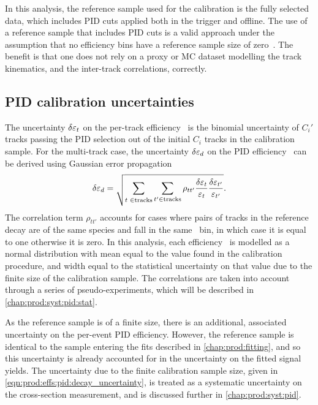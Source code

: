 In this analysis, the reference sample used for the calibration is the fully 
selected data, which includes \ac{PID} cuts applied both in the trigger and 
offline.
The use of a reference sample that includes \ac{PID} cuts is a valid approach 
under the assumption that no efficiency bins have a reference sample size of 
zero~\cite{Anderlini:2202412}.
The benefit is that one does not rely on a proxy or \ac{MC} dataset modelling 
the track kinematics, and the inter-track correlations, correctly.

\subsection{\ac{PID} calibration uncertainties}
\label{chap:prod:effs:pid:uncertainties}

The uncertainty $\delta{\ensuremath{\varepsilon_{t}}}$ on the per-track efficiency \effpidtrack\ 
is the binomial uncertainty of $C_{i}'$ tracks passing the \ac{PID} selection 
out of the initial $C_{i}$ tracks in the calibration sample.
For the multi-track case, the uncertainty $\delta{\ensuremath{\varepsilon_{d}}}$ on the \ac{PID} 
efficiency \effpiddecay\ can be derived using Gaussian error propagation
\begin{equation}
  \unc{\effpiddecay} = \sqrt{%
    \sum_{t\phantom{'}\in\text{tracks}}\sum_{t'\in\text{tracks}}
      \rho_{tt'}
      \frac{%
        \unc{\effpidtrack}
      }{%
        \effpidtrack
      }
      \frac{%
        \unc{\eff_{t'}}
      }{%
        \eff_{t'}
      }
  }.
  \label{eqn:prod:effs:pid:decay_uncertainty}
\end{equation}
The correlation term $\rho_{tt'}$ accounts for cases where pairs of tracks in 
the reference decay are of the same species and fall in the same \ptotetanspd\ 
bin, in which case it is equal to one otherwise it is zero.
In this analysis, each efficiency \effpidtrack\ is modelled as a normal 
distribution with mean equal to the value found in the calibration procedure, 
and width equal to the statistical uncertainty on that value due to the finite 
size of the calibration sample.
The correlations are taken into account through a series of pseudo-experiments, 
which will be described in \cref{chap:prod:syst:pid:stat}.

As the reference sample is of a finite size, there is an additional, associated 
uncertainty on the per-event \ac{PID} efficiency.
However, the reference sample is identical to the sample entering the fits 
described in \cref{chap:prod:fitting}, and so this uncertainty is already 
accounted for in the uncertainty on the fitted signal yields.
The uncertainty due to the finite calibration sample size, given in 
\cref{eqn:prod:effs:pid:decay_uncertainty}, is treated as a systematic 
uncertainty on the cross-section measurement, and is discussed further in 
\cref{chap:prod:syst:pid}.

